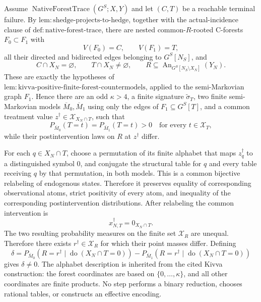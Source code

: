 Assume \(\operatorname{NativeForestTrace}(G^S;X,Y)\) and let \((C,T)\) be a reachable terminal failure. By \(\mathrm{lem:shedge\text{-}projects\text{-}to\text{-}hedge}\), together with the actual-incidence clause of \(\mathrm{def:native\text{-}forest\text{-}trace}\), there are nested common-\(R\)-rooted C-forests \(F_0\subset F_1\) with
\[
 V(F_0)=C,\qquad V(F_1)=T,
\]
all their directed and bidirected edges belonging to \(G^S[N_S]\), and
\[
 C\cap X_N=\varnothing,\qquad
 T\cap X_N\ne\varnothing,\qquad
 R\subseteq\operatorname{An}_{G^S[N_S\setminus X_N]}(Y_N).
\]
These are exactly the hypotheses of \(\mathrm{lem:kivva\text{-}positive\text{-}finite\text{-}forest\text{-}countermodels}\), applied to the semi-Markovian graph \(F_1\). Hence there are an odd \(\kappa>4\), a finite signature \(\widetilde\sigma_T\), two finite semi-Markovian models \(\overline M_0,\overline M_1\) using only the edges of \(F_1\subseteq G^S[T]\), and a common treatment value \(z^\dagger\in\mathcal X_{X_N\cap T}\), such that
\[
 P_{\overline M_0}(T=t)=P_{\overline M_1}(T=t)>0
 \quad\text{for every }t\in\mathcal X_T,
\]
while their postintervention laws on \(R\) at \(z^\dagger\) differ.

For each \(q\in X_N\cap T\), choose a permutation of its finite alphabet that maps \(z_q^\dagger\) to a distinguished symbol \(0\), and conjugate the structural table for \(q\) and every table receiving \(q\) by that permutation, in both models. This is a common bijective relabeling of endogenous states. Therefore it preserves equality of corresponding observational atoms, strict positivity of every atom, and inequality of the corresponding postintervention distributions. After relabeling the common intervention is
\[
 x_{N,T}^\dagger=0_{X_N\cap T}.
\]
The two resulting probability measures on the finite set \(\mathcal X_R\) are unequal. Therefore there exists \(r^\dagger\in\mathcal X_R\) for which their point masses differ. Defining
\[
 \delta=
 P_{\overline M_0}(R=r^\dagger\mid\operatorname{do}(X_N\cap T=0))
 -P_{\overline M_1}(R=r^\dagger\mid\operatorname{do}(X_N\cap T=0))
\]
gives \(\delta\ne0\). The alphabet description is inherited from the cited Kivva construction: the forest coordinates are based on \(\{0,\ldots,\kappa\}\), and all other coordinates are finite products. No step performs a binary reduction, chooses rational tables, or constructs an effective encoding.